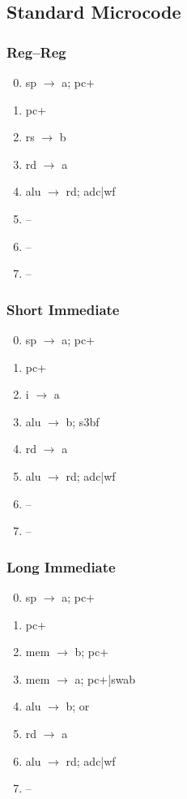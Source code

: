 \documentclass[11pt]{book}
\begin{document}
\subsection*{Standard Microcode}
\begin{multicols}{3}\ttfamily\selectfont\small
  \subsubsection*{Reg--Reg}
  \begin{enumerate}\setcounter{enumi}{-1}
  \item sp \(\rightarrow\) a; pc+
  \item pc+
  \item rs \(\rightarrow\) b
  \item rd \(\rightarrow\) a
  \item alu \(\rightarrow\) rd; adc|wf
  \item --
  \item --
  \item --
  \end{enumerate}
  \columnbreak
  \subsubsection*{Short Immediate}
  \begin{enumerate}\setcounter{enumi}{-1}
  \item sp \(\rightarrow\) a; pc+
  \item pc+
  \item i \(\rightarrow\) a
  \item alu \(\rightarrow\) b; s3bf
  \item rd \(\rightarrow\) a
  \item alu \(\rightarrow\) rd; adc|wf
  \item --
  \item --
  \end{enumerate}
  \columnbreak
  \subsubsection*{Long Immediate}
  \begin{enumerate}\setcounter{enumi}{-1}
  \item sp \(\rightarrow\) a; pc+
  \item pc+
  \item mem \(\rightarrow\) b; pc+
  \item mem \(\rightarrow\) a; pc+|swab
  \item alu \(\rightarrow\) b; or
  \item rd \(\rightarrow\) a
  \item alu \(\rightarrow\) rd; adc|wf
  \item --
  \end{enumerate}
\end{multicols}
\end{document}
